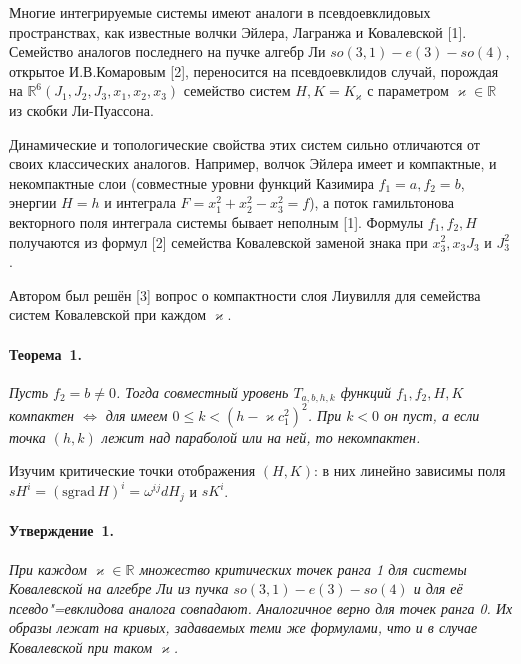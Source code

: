 
\vzmscaption

Многие интегрируемые системы имеют аналоги в псевдоевклидовых пространствах, как известные волчки Эйлера, Лагранжа и Ковалевской [1]. Семейство аналогов последнего на пучке алгебр Ли $so(3,1)-e(3)-so(4)$, открытое И.В.Комаровым [2], переносится на псевдоевклидов случай, порождая на $\mathbb{R}^6(J_1, J_2, J_3, x_1, x_2, x_3)$ семейство систем $H, K = K_{\varkappa}$ с параметром $\varkappa \in \mathbb{R}$ из скобки Ли-Пуассона.

Динамические и топологические свойства этих систем сильно отличаются от своих классических аналогов. Например, волчок Эйлера имеет и компактные, и некомпактные слои (совместные уровни функций Казимира $f_1 =a, f_2=b$, энергии $H=h$ и интеграла $F = x_1^2 + x_2^2 - x_3^2 =f$), а поток гамильтонова векторного поля интеграла системы бывает неполным [1]. Формулы $f_1, f_2, H$ получаются из формул [2] семейства Ковалевской заменой знака при $x_3^2, x_3 J_3$ и $J_3^2$.

Автором был решён [3] вопрос о компактности слоя Лиувилля для семейства систем Ковалевской при каждом $\varkappa$.
\paragraph{Теорема~1.}
{\it
	Пусть $f_2 = b \ne 0$. Тогда совместный уровень $T_{a, b, h, k}$ функций $f_1, f_2, H, K$ компактен $\Leftrightarrow$ для имеем $0 \le k < (h -\varkappa c_1^2)^2$. При $k <0$ он пуст, а если точка $(h, k)$ лежит над параболой или на ней, то некомпактен.
}

Изучим критические точки отображения $(H, K)$: в них линейно зависимы поля $sH^i = (\mathrm{sgrad}\,H)^i = \omega^{ij} dH_j$ и $sK^i$.

\paragraph{Утверждение~1.}
{\it
	При каждом $\varkappa \in \mathbb{R}$ множество критических точек ранга 1 для системы Ковалевской на алгебре Ли из пучка $so(3,1)-e(3)-so(4)$ и для её псевдо"=евклидова аналога совпадают. Аналогичное верно для точек ранга 0. Их образы лежат на кривых, задаваемых теми же формулами, что и в случае Ковалевской при таком $\varkappa$.
}

